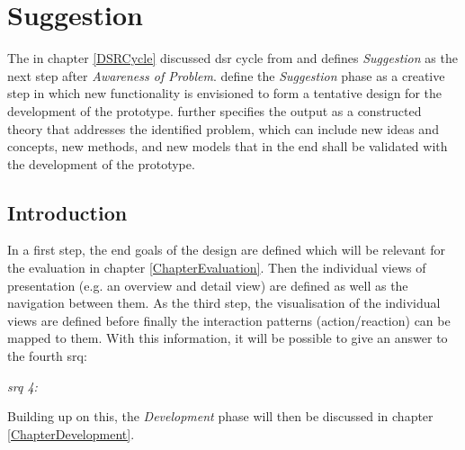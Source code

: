 
\chapter{Suggestion}

\label{ChapterSuggestion}

The in chapter \ref{DSRCycle} discussed \gls{dsr} cycle from \cite{Vaishnavi2008} and \cite{Hevner2010} defines \textit{Suggestion} as the next step after \textit{Awareness of Problem}. \cite{Vaishnavi2008} define the \textit{Suggestion} phase as a creative step in which new functionality is envisioned to form a tentative design for the development of the prototype. \cite{Vaishnavi2008} further specifies the output as a constructed theory that addresses the identified problem, which can include new ideas and concepts, new methods, and new models that in the end shall be validated with the development of the prototype.


\section{Introduction}

In a first step, the end goals of the design are defined which will be relevant for the evaluation in chapter \ref{ChapterEvaluation}. Then the individual views of presentation (e.g. an overview and detail view) are defined as well as the navigation between them. As the third step, the visualisation of the individual views are defined before finally the interaction patterns (action/reaction) can be mapped to them. With this information, it will be possible to give an answer to the fourth \gls{srq}:
\begin{framed}
 	\textit{\gls{srq} 4: \srqfourtext}
\end{framed}
Building up on this, the \textit{Development} phase will then be discussed in chapter \ref{ChapterDevelopment}.



